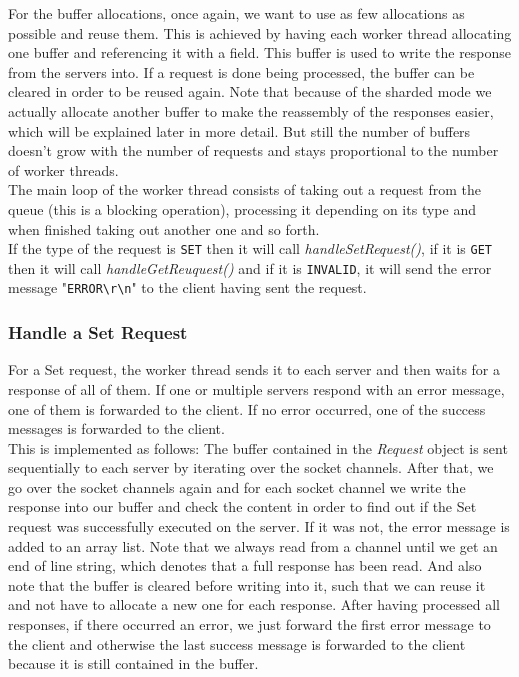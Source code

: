 For the buffer allocations, once again, we want to use as few allocations as possible and reuse them. This is achieved by having each worker thread allocating one buffer and referencing it with a field. This buffer is used to write the response from the servers into. If a request is done being processed, the buffer can be cleared in order to be reused again. Note that because of the sharded mode we actually allocate another buffer to make the reassembly of the responses easier, which will be explained later in more detail. But still the number of buffers doesn't grow with the number of requests and stays proportional to the number of worker threads.\\

The main loop of the worker thread consists of taking out a request from the queue (this is a blocking operation), processing it depending on its type and when finished taking out another one and so forth. \\
If the type of the request is \texttt{SET} then it will call \textit{handleSetRequest()}, if it is \texttt{GET} then it will call \textit{handleGetReuquest()} and if it is \texttt{INVALID}, it will send the error message "\texttt{ERROR}\texttt{\textbackslash r\textbackslash n}" to the client having sent the request.

\subsubsection{Handle a Set Request}
For a Set request, the worker thread sends it to each server and then waits for a response of all of them. If one or multiple servers respond with an error message, one of them is forwarded to the client. If no error occurred, one of the success messages is forwarded to the client. \\
This is implemented as follows: The buffer contained in the \textit{Request} object is sent sequentially to each server by iterating over the socket channels. After that, we go over the socket channels again and for each socket channel we write the response into our buffer and check the content in order to find out if the Set request was successfully executed on the server. If it was not, the error message is added to an array list. Note that we always read from a channel until we get an end of line string, which denotes that a full response has been read. And also note that the buffer is cleared before writing into it, such that we can reuse it and not have to allocate a new one for each response. After having processed all responses, if there occurred an error, we just forward the first error message to the client and otherwise the last success message is forwarded to the client because it is still contained in the buffer. 

